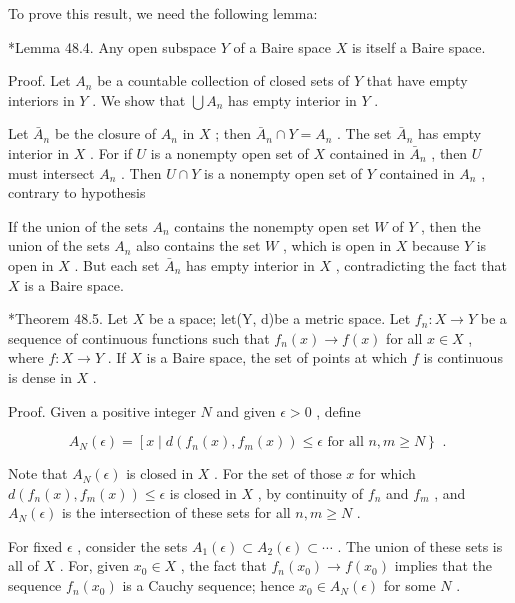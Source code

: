 To prove this result, we need the following lemma:

*Lemma 48.4. Any open subspace \(Y\) of a Baire space \(X\) is itself a Baire space.

Proof. Let \({A}_{n}\) be a countable collection of closed sets of \(Y\) that have empty interiors in \(Y\) . We show that \(\bigcup {A}_{n}\) has empty interior in \(Y\) .

Let \({\bar{A}}_{n}\) be the closure of \({A}_{n}\) in \(X\) ; then \({\bar{A}}_{n} \cap  Y = {A}_{n}\) . The set \({\bar{A}}_{n}\) has empty interior in \(X\) . For if \(U\) is a nonempty open set of \(X\) contained in \({\bar{A}}_{n}\) , then \(U\) must intersect \({A}_{n}\) . Then \(U \cap  Y\) is a nonempty open set of \(Y\) contained in \({A}_{n}\) , contrary to hypothesis

If the union of the sets \({A}_{n}\) contains the nonempty open set \(W\) of \(Y\) , then the union of the sets \({A}_{n}\) also contains the set \(W\) , which is open in \(X\) because \(Y\) is open in \(X\) . But each set \({\bar{A}}_{n}\) has empty interior in \(X\) , contradicting the fact that \(X\) is a Baire space.

*Theorem 48.5. Let \(X\) be a space; let(Y, d)be a metric space. Let \({f}_{n} : X \rightarrow  Y\) be a sequence of continuous functions such that \({f}_{n}\left( x\right)  \rightarrow  f\left( x\right)\) for all \(x \in  X\) , where \(f : X \rightarrow  Y\) . If \(X\) is a Baire space, the set of points at which \(f\) is continuous is dense in \(X\) .

Proof. Given a positive integer \(N\) and given \(\epsilon  > 0\) , define

\[
{A}_{N}\left( \epsilon \right)  = \left\lbrack  {x \mid  d\left( {{f}_{n}\left( x\right) ,{f}_{m}\left( x\right) }\right)  \leq  \epsilon }\right. \text{ for all }\left. {n,m \geq  N}\right\}  \text{ . }
\]

Note that \({A}_{N}\left( \epsilon \right)\) is closed in \(X\) . For the set of those \(x\) for which \(d\left( {{f}_{n}\left( x\right) ,{f}_{m}\left( x\right) }\right)  \leq  \epsilon\) is closed in \(X\) , by continuity of \({f}_{n}\) and \({f}_{m}\) , and \({A}_{N}\left( \epsilon \right)\) is the intersection of these sets for all \(n,m \geq  N\) .

For fixed \(\epsilon\) , consider the sets \({A}_{1}\left( \epsilon \right)  \subset  {A}_{2}\left( \epsilon \right)  \subset  \cdots\) . The union of these sets is all of \(X\) . For, given \({x}_{0} \in  X\) , the fact that \({f}_{n}\left( {x}_{0}\right)  \rightarrow  f\left( {x}_{0}\right)\) implies that the sequence \({f}_{n}\left( {x}_{0}\right)\) is a Cauchy sequence; hence \({x}_{0} \in  {A}_{N}\left( \epsilon \right)\) for some \(N\) .

